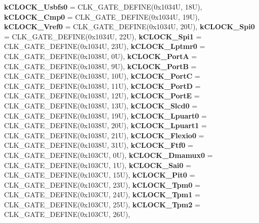 \begin{DoxyCompactItemize}
{\bfseries k\+C\+L\+O\+C\+K\+\_\+\+Usbfs0} = C\+L\+K\+\_\+\+G\+A\+T\+E\+\_\+\+D\+E\+F\+I\+NE(0x1034U, 18U), 
{\bfseries k\+C\+L\+O\+C\+K\+\_\+\+Cmp0} = C\+L\+K\+\_\+\+G\+A\+T\+E\+\_\+\+D\+E\+F\+I\+NE(0x1034U, 19U), 
{\bfseries k\+C\+L\+O\+C\+K\+\_\+\+Vref0} = C\+L\+K\+\_\+\+G\+A\+T\+E\+\_\+\+D\+E\+F\+I\+NE(0x1034U, 20U), 
{\bfseries k\+C\+L\+O\+C\+K\+\_\+\+Spi0} = C\+L\+K\+\_\+\+G\+A\+T\+E\+\_\+\+D\+E\+F\+I\+NE(0x1034U, 22U), 
\newline
{\bfseries k\+C\+L\+O\+C\+K\+\_\+\+Spi1} = C\+L\+K\+\_\+\+G\+A\+T\+E\+\_\+\+D\+E\+F\+I\+NE(0x1034U, 23U), 
{\bfseries k\+C\+L\+O\+C\+K\+\_\+\+Lptmr0} = C\+L\+K\+\_\+\+G\+A\+T\+E\+\_\+\+D\+E\+F\+I\+NE(0x1038U, 0U), 
{\bfseries k\+C\+L\+O\+C\+K\+\_\+\+PortA} = C\+L\+K\+\_\+\+G\+A\+T\+E\+\_\+\+D\+E\+F\+I\+NE(0x1038U, 9U), 
{\bfseries k\+C\+L\+O\+C\+K\+\_\+\+PortB} = C\+L\+K\+\_\+\+G\+A\+T\+E\+\_\+\+D\+E\+F\+I\+NE(0x1038U, 10U), 
\newline
{\bfseries k\+C\+L\+O\+C\+K\+\_\+\+PortC} = C\+L\+K\+\_\+\+G\+A\+T\+E\+\_\+\+D\+E\+F\+I\+NE(0x1038U, 11U), 
{\bfseries k\+C\+L\+O\+C\+K\+\_\+\+PortD} = C\+L\+K\+\_\+\+G\+A\+T\+E\+\_\+\+D\+E\+F\+I\+NE(0x1038U, 12U), 
{\bfseries k\+C\+L\+O\+C\+K\+\_\+\+PortE} = C\+L\+K\+\_\+\+G\+A\+T\+E\+\_\+\+D\+E\+F\+I\+NE(0x1038U, 13U), 
{\bfseries k\+C\+L\+O\+C\+K\+\_\+\+Slcd0} = C\+L\+K\+\_\+\+G\+A\+T\+E\+\_\+\+D\+E\+F\+I\+NE(0x1038U, 19U), 
\newline
{\bfseries k\+C\+L\+O\+C\+K\+\_\+\+Lpuart0} = C\+L\+K\+\_\+\+G\+A\+T\+E\+\_\+\+D\+E\+F\+I\+NE(0x1038U, 20U), 
{\bfseries k\+C\+L\+O\+C\+K\+\_\+\+Lpuart1} = C\+L\+K\+\_\+\+G\+A\+T\+E\+\_\+\+D\+E\+F\+I\+NE(0x1038U, 21U), 
{\bfseries k\+C\+L\+O\+C\+K\+\_\+\+Flexio0} = C\+L\+K\+\_\+\+G\+A\+T\+E\+\_\+\+D\+E\+F\+I\+NE(0x1038U, 31U), 
{\bfseries k\+C\+L\+O\+C\+K\+\_\+\+Ftf0} = C\+L\+K\+\_\+\+G\+A\+T\+E\+\_\+\+D\+E\+F\+I\+NE(0x103\+CU, 0U), 
\newline
{\bfseries k\+C\+L\+O\+C\+K\+\_\+\+Dmamux0} = C\+L\+K\+\_\+\+G\+A\+T\+E\+\_\+\+D\+E\+F\+I\+NE(0x103\+CU, 1U), 
{\bfseries k\+C\+L\+O\+C\+K\+\_\+\+Sai0} = C\+L\+K\+\_\+\+G\+A\+T\+E\+\_\+\+D\+E\+F\+I\+NE(0x103\+CU, 15U), 
{\bfseries k\+C\+L\+O\+C\+K\+\_\+\+Pit0} = C\+L\+K\+\_\+\+G\+A\+T\+E\+\_\+\+D\+E\+F\+I\+NE(0x103\+CU, 23U), 
{\bfseries k\+C\+L\+O\+C\+K\+\_\+\+Tpm0} = C\+L\+K\+\_\+\+G\+A\+T\+E\+\_\+\+D\+E\+F\+I\+NE(0x103\+CU, 24U), 
\newline
{\bfseries k\+C\+L\+O\+C\+K\+\_\+\+Tpm1} = C\+L\+K\+\_\+\+G\+A\+T\+E\+\_\+\+D\+E\+F\+I\+NE(0x103\+CU, 25U), 
{\bfseries k\+C\+L\+O\+C\+K\+\_\+\+Tpm2} = C\+L\+K\+\_\+\+G\+A\+T\+E\+\_\+\+D\+E\+F\+I\+NE(0x103\+CU, 26U), 

\end{DoxyCompactItemize}
